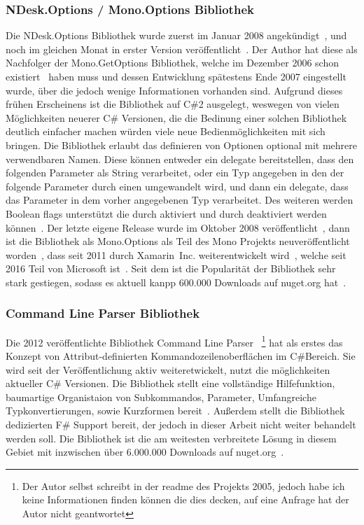  \subsubsection{NDesk.Options / Mono.Options Bibliothek}
 Die NDesk.Options Bibliothek wurde zuerst im Januar 2008 angekündigt~\cite{NDeskAnnouncement},
 und noch im gleichen Monat in erster Version veröffentlicht~\cite{NDesk1stRelease}.
 Der Author hat diese als Nachfolger der Mono.GetOptions Bibliothek,
 welche im Dezember 2006 schon existiert~\cite{MonoGetOptions3rdBlogPost} haben muss und dessen Entwicklung spätestens Ende 2007 eingestellt wurde,
 über die jedoch wenige Informationen vorhanden sind.
 Aufgrund dieses frühen Erscheinens ist die Bibliothek auf C\#2 ausgelegt, weswegen von vielen Möglichkeiten neuerer C\# Versionen,
 die die Bedinung einer solchen Bibliothek deutlich einfacher machen würden viele neue Bedienmöglichkeiten mit sich bringen.
 Die Bibliothek erlaubt das definieren von Optionen optional mit mehrere verwendbaren Namen.
 Diese können entweder ein delegate bereitstellen, dass den folgenden Parameter als String verarbeitet,
 oder ein Typ angegeben in den der folgende Parameter durch einen  umgewandelt wird,
 und dann ein delegate, dass das Parameter in dem vorher angegebenen Typ verarbeitet.
 Des weiteren werden Boolean flags unterstützt die durch  aktiviert
 und durch  deaktiviert werden können~\cite{NDeskOptionSetDocumentation}.
 Der letzte eigene Release wurde im Oktober 2008 veröffentlicht~\cite{NDeskOptionsLastRelease},
 dann ist die Bibliothek als Mono.Options als Teil des Mono Projekts neuveröffentlicht worden~\cite{MonoOptions1stCommit},
 dass seit 2011 durch Xamarin~Inc. weiterentwickelt wird~\cite{MonoFutureInterview}, welche seit 2016 Teil von Microsoft ist~\cite{MicrosoftBlogAcquireXamarin}.
 Seit dem ist die Popularität der Bibliothek sehr stark gestiegen, sodass es aktuell kanpp 600.000 Downloads auf nuget.org hat~\cite{MonoOptionsNuget}.
 \subsubsection{Command Line Parser Bibliothek}
 Die 2012 veröffentlichte Bibliothek Command Line Parser~\cite{FirstCommandLineParserCommit}
 \footnote{Der Autor selbst schreibt in der readme des Projekts 2005, jedoch habe ich keine Informationen finden können die dies decken, auf eine Anfrage hat der Autor nicht geantwortet}
 hat als erstes das Konzept von Attribut-definierten Kommandozeilenoberflächen im C\#Bereich.
 Sie wird seit der Veröffentlichung aktiv weiteretwickelt, nutzt die möglichkeiten aktueller C\# Versionen.
 Die Bibliothek stellt eine vollständige Hilfefunktion, baumartige Organistaion von Subkommandos, Parameter, Umfangreiche Typkonvertierungen, sowie Kurzformen bereit~\cite{CommandLineParserWiki}.
 Au\ss erdem stellt die Bibliothek dedizierten F\# Support bereit, der jedoch in dieser Arbeit nicht weiter behandelt werden soll.
 Die Bibliothek ist die am weitesten verbreitete Lösung in diesem Gebiet mit inzwischen über 6.000.000 Downloads auf nuget.org~\cite{CommandLineParserNuget}.